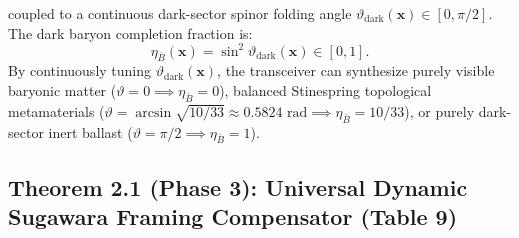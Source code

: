 \documentclass[11pt,onecolumn]{article}
\begin{document}
coupled to a continuous dark-sector spinor folding angle $\vartheta_{\text{dark}}(\mathbf{x}) \in [0, \pi/2]$. The dark baryon completion fraction is:
\begin{equation}
\eta_{\bar{B}}(\mathbf{x}) = \sin^2 \vartheta_{\text{dark}}(\mathbf{x}) \in [0, 1].
\label{eq:dark_baryon_fraction}
\end{equation}
By continuously tuning $\vartheta_{\text{dark}}(\mathbf{x})$, the transceiver can synthesize purely visible baryonic matter ($\vartheta = 0 \implies \eta_{\bar{B}} = 0$), balanced Stinespring topological metamaterials ($\vartheta = \arcsin\sqrt{10/33} \approx 0.5824\text{ rad} \implies \eta_{\bar{B}} = 10/33$), or purely dark-sector inert ballast ($\vartheta = \pi/2 \implies \eta_{\bar{B}} = 1$).

\FloatBarrier
\subsection{Theorem 2.1 (Phase 3): Universal Dynamic Sugawara Framing Compensator (Table 9)}
\end{document}
